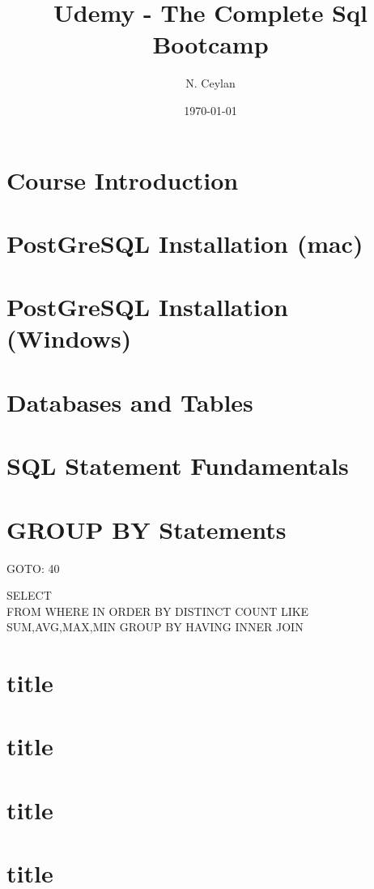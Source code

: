 \documentclass[letterpaper,12pt]{article}
\begin{document}
\title{Udemy - The Complete Sql Bootcamp}
\author{N. Ceylan}
\date{\today}
\maketitle






\section{Course Introduction}


\section{PostGreSQL Installation (mac)}
\section{PostGreSQL Installation (Windows)}


\section{ Databases and Tables}


\section{ SQL Statement Fundamentals}
\section{ GROUP BY Statements}

GOTO: 40

SELECT \\ 
FROM      
WHERE
IN
ORDER BY
DISTINCT
COUNT
LIKE
SUM,AVG,MAX,MIN
GROUP BY
HAVING
INNER JOIN

\section{title}

\section{title}

\section{title}

\section{title}
\end{document}
